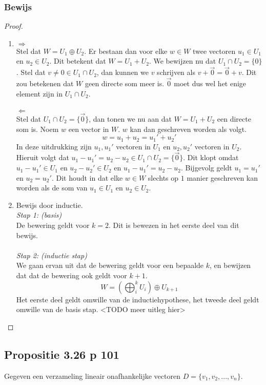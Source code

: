 \documentclass[lineaire_algebra_oplossingen.tex]{subfiles}
\begin{document}
\subsubsection*{Bewijs}
\begin{proof}
\begin{enumerate}7
\item
\emph{$\Rightarrow$}\\
Stel dat $W = U_1 \oplus U_2$. Er bestaan dan voor elke $w\in W$ twee vectoren $u_1\in U_1$ en $u_2 \in U_2$. Dit betekent dat $W = U_1+U_2$. We bewijzen nu dat $U_1\cap U_2 = \{0\}$. Stel dat $v \neq 0 \in U_1\cap U_2$, dan kunnen we $v$ schrijven als $v+\vec{0}=\vec{0}+v$. Dit zou betekenen dat $W$ geen directe som meer is. $\vec{0}$ moet dus wel het enige element zijn in $U_1\cap U_2$.\\\\
\emph{$\Leftarrow$}\\
Stel dat $U_1\cap U_2 = \{\vec{0}\}$, dan tonen we nu aan dat $W = U_1+U_2$ een directe som is. Noem $w$ een vector in $W$. $w$ kan dan geschreven worden als volgt.
\[
w = u_1+u_2=u_1'+u_2'
\]
In deze uitdrukking zijn $u_1,u_1'$ vectoren in $U_1$ en $u_2,u_2'$ vectoren in $U_2$. Hieruit volgt dat $u_1-u_1'=u_2-u_2 \in U_1\cap U_2 = \{\vec{0}\}$. Dit klopt omdat $u_1-u_1' \in U_1$ en $u_2-u_2' \in U_2$ en $u_1-u_1'=u_2-u_2$. Bijgevolg geldt $u_1 = u_1'$ en $u_2=u_2'$. Dit houdt in dat elke $w \in W$ slechts op $1$ manier geschreven kan worden als de som van $u_1\in U_1$ en $u_2\in U_2$.
\item
Bewijs door inductie.\\
\emph{Stap 1: (basis)}\\
De bewering geldt voor $k=2$. Dit is bewezen in het eerste deel van dit bewijs.\\\\
\emph{Stap 2: (inductie stap)}\\
We gaan ervan uit dat de bewering geldt voor een bepaalde $k$, en bewijzen dat dat de bewering ook geldt voor $k+1$.
\[
W = (\bigoplus_i^k U_i) \oplus U_{k+1}
\]
Het eerste deel geldt omwille van de inductiehypothese, het tweede deel geldt omwille van de basis stap. <TODO meer uitleg hier>
\end{enumerate}
\end{proof}

\subsection{Propositie 3.26 p 101}
Gegeven een verzameling lineair onafhankelijke vectoren $D= \{v_1,v_2,...,v_n\}$.
\end{document}
